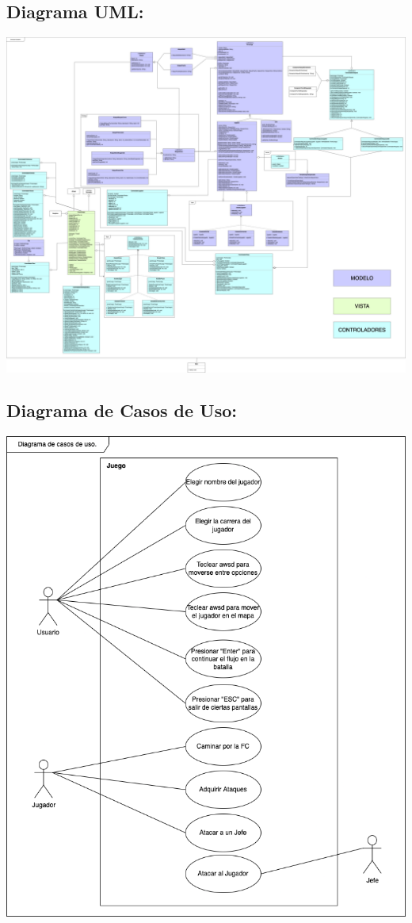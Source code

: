 \documentclass{article}
\begin{document}
\newpage
\subsection*{Diagrama UML:}
\begin{center}
  \includegraphics[scale=0.10]{./CienciasExceptionUML.png}
\end{center}

\subsection*{Diagrama de Casos de Uso:}
\begin{center}
  \includegraphics[scale=0.18]{./DiagramaDeCasosDeUso.png}
\end{center}
\end{document}
